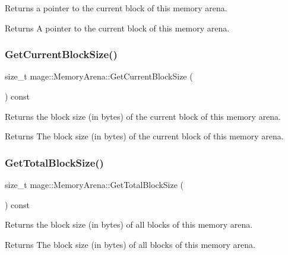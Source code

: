 Returns a pointer to the current block of this memory arena.

\begin{DoxyReturn}{Returns}
A pointer to the current block of this memory arena. 
\end{DoxyReturn}
\hypertarget{classmage_1_1_memory_arena_a2789bf0c58dee881662bbb0c5ba73e55}{}\label{classmage_1_1_memory_arena_a2789bf0c58dee881662bbb0c5ba73e55} 
\subsubsection{\texorpdfstring{Get\+Current\+Block\+Size()}{GetCurrentBlockSize()}}
{\footnotesize\ttfamily size\+\_\+t mage\+::\+Memory\+Arena\+::\+Get\+Current\+Block\+Size (\begin{DoxyParamCaption}{ }\end{DoxyParamCaption}) const}

Returns the block size (in bytes) of the current block of this memory arena.

\begin{DoxyReturn}{Returns}
The block size (in bytes) of the current block of this memory arena. 
\end{DoxyReturn}
\hypertarget{classmage_1_1_memory_arena_ac4be7fb4d5623d6f78b1576c7884883a}{}\label{classmage_1_1_memory_arena_ac4be7fb4d5623d6f78b1576c7884883a} 
\subsubsection{\texorpdfstring{Get\+Total\+Block\+Size()}{GetTotalBlockSize()}}
{\footnotesize\ttfamily size\+\_\+t mage\+::\+Memory\+Arena\+::\+Get\+Total\+Block\+Size (\begin{DoxyParamCaption}{ }\end{DoxyParamCaption}) const}

Returns the block size (in bytes) of all blocks of this memory arena.

\begin{DoxyReturn}{Returns}
The block size (in bytes) of all blocks of this memory arena. 
\end{DoxyReturn}
\hypertarget{classmage_1_1_memory_arena_a7e7799f859c55435714933972ecb8b95}{}\label{classmage_1_1_memory_arena_a7e7799f859c55435714933972ecb8b95} 
